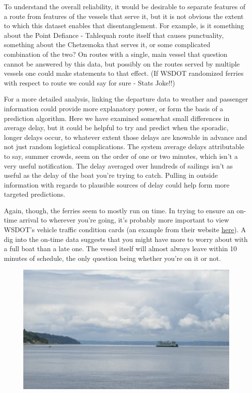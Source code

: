 \documentclass[11pt, letterpaper]{article}
\begin{document}
To understand the overall reliability, it would be desirable to separate features of a route from features of the vessels that serve it, but it is not obvious the extent to which this dataset enables that disentanglement. For example, is it something about the Point Defiance - Tahlequah route itself that causes punctuality, something about the Chetzemoka that serves it, or some complicated combination of the two? On routes with a single, main vessel that question cannot be answered by this data, but possibly on the routes served by multiple vessels one could make statements to that effect. (If WSDOT randomized ferries with respect to route we could say for sure - Stats Joke!!)

For a more detailed analysis, linking the departure data to weather and passenger information could provide more explanatory power, or form the basis of a prediction algorithm. Here we have examined somewhat small differences in average delay, but it could be helpful to try and predict when the sporadic, longer delays occur, to whatever extent those delays are knowable in advance and not just random logistical complications. The system average delays attributable to say, summer crowds, seem on the order of one or two minutes, which isn't a very useful notification. The delay averaged over hundreds of sailings isn't as useful as the delay of the boat you're trying to catch. Pulling in outside information with regards to plausible sources of delay could help form more targeted predictions.

Again, though, the ferries seem to mostly run on time. In trying to ensure an on-time arrival to wherever you're going, it's probably more important to view WSDOT's vehicle traffic condition cards (an example from their website {\color{blue}\href{http://www.wsdot.wa.gov/ferries/traffic_stats/congestion/spring/SeattleBainbridgeSpring2015.pdf}{here}}). A dig into the on-time data suggests that you might have more to worry about with a full boat than a late one. The vessel itself will almost always leave within 10 minutes of schedule, the only question being whether you're on it or not.




\begin{figure}
\begin{center}
\includegraphics[scale = .55]{ferry2.jpg}
\end{center}
\end{figure}
\end{document}
